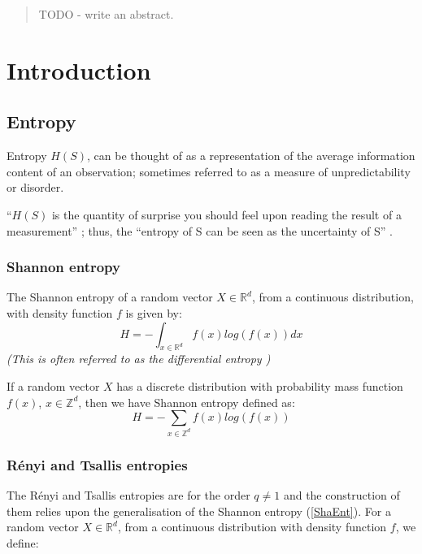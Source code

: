 \documentclass[12pt]{report}
\begin{document}
\begin{abstract}
TODO - write an abstract.
\end{abstract}

\tableofcontents

\chapter{Introduction} 

\section{Entropy}

Entropy $H(S)$, can be thought of as a representation of the average information content of an observation; sometimes referred to as a measure of unpredictability or disorder. 

``$H(S)$ is the quantity of surprise you should feel upon reading the result of a measurement'' \cite{entdef}; thus, the ``entropy of S can be seen as the uncertainty of S'' \cite{paper7}.

\subsection{Shannon entropy}
The Shannon entropy of a random vector $X \in \mathbb{R}^d$, from a continuous distribution, with density function $f$ is given by:
\begin{equation} \label{ShaEnt}
H = - \int_{x \in \mathbb{R}^d} f(x) log(f(x)) dx 
\end{equation}
\textit{(This is often referred to as the differential entropy \cite{book2})}

If a random vector $X$ has a discrete distribution with probability mass function $f(x)$, $x \in \mathbb{Z}^d$, then we have Shannon entropy defined as:
\begin{equation} 
H = - \sum_{x \in \mathbb{Z}^{d}} f(x) log(f(x)) \nonumber
\end{equation}



\subsection{R\'enyi and Tsallis entropies}
The R\'enyi and Tsallis entropies are for the order $q \neq 1$ and the construction of them relies upon the generalisation of the Shannon entropy (\ref{ShaEnt}). For a random vector $X \in \mathbb{R}^d$, from a continuous distribution with density function $f$, we define:
\end{document}
